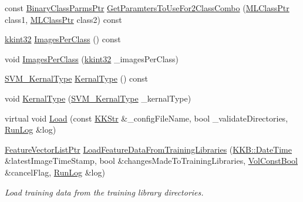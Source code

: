 \begin{DoxyCompactItemize}
const \hyperlink{namespace_k_k_m_l_l_aca399c0744e11553270ffaca507cfee7}{Binary\+Class\+Parms\+Ptr} \hyperlink{class_k_k_m_l_l_1_1_training_configuration2_a0caad40dc963b99056025ffa71552e68}{Get\+Paramters\+To\+Use\+For2\+Class\+Combo} (\hyperlink{namespace_k_k_m_l_l_ac272393853d59e72e8456f14cd6d8c23}{M\+L\+Class\+Ptr} class1, \hyperlink{namespace_k_k_m_l_l_ac272393853d59e72e8456f14cd6d8c23}{M\+L\+Class\+Ptr} class2) const 
\item 
\hyperlink{namespace_k_k_b_a8fa4952cc84fda1de4bec1fbdd8d5b1b}{kkint32} \hyperlink{class_k_k_m_l_l_1_1_training_configuration2_a0601497691c99932c183fdc963f893f0}{Images\+Per\+Class} () const 
\item 
void \hyperlink{class_k_k_m_l_l_1_1_training_configuration2_abf4bb79d4b15976cdd58d0822b405cb3}{Images\+Per\+Class} (\hyperlink{namespace_k_k_b_a8fa4952cc84fda1de4bec1fbdd8d5b1b}{kkint32} \+\_\+images\+Per\+Class)
\item 
\hyperlink{namespace_k_k_m_l_l_a14bbc982261fe6adeaf682c543ef9569}{S\+V\+M\+\_\+\+Kernal\+Type} \hyperlink{class_k_k_m_l_l_1_1_training_configuration2_a5e39618d6daf2b3880e041f68ad11892}{Kernal\+Type} () const 
\item 
void \hyperlink{class_k_k_m_l_l_1_1_training_configuration2_a7b69e2672eaf4dd259dc72b6caacfa89}{Kernal\+Type} (\hyperlink{namespace_k_k_m_l_l_a14bbc982261fe6adeaf682c543ef9569}{S\+V\+M\+\_\+\+Kernal\+Type} \+\_\+kernal\+Type)
\item 
virtual void \hyperlink{class_k_k_m_l_l_1_1_training_configuration2_a89bb53ad704979d78053e1ae8d1253c6}{Load} (const \hyperlink{class_k_k_b_1_1_k_k_str}{K\+K\+Str} \&\+\_\+config\+File\+Name, bool \+\_\+validate\+Directories, \hyperlink{class_k_k_b_1_1_run_log}{Run\+Log} \&log)
\item 
\hyperlink{namespace_k_k_m_l_l_acf2ba92a3cf03e2b19674b24ff488ef6}{Feature\+Vector\+List\+Ptr} \hyperlink{class_k_k_m_l_l_1_1_training_configuration2_a0458a41c5a46980b580fed613bf35734}{Load\+Feature\+Data\+From\+Training\+Libraries} (\hyperlink{class_k_k_b_1_1_date_time}{K\+K\+B\+::\+Date\+Time} \&latest\+Image\+Time\+Stamp, bool \&changes\+Made\+To\+Training\+Libraries, \hyperlink{namespace_k_k_b_a7d390f568e2831fb76b86b56c87bf92f}{Vol\+Const\+Bool} \&cancel\+Flag, \hyperlink{class_k_k_b_1_1_run_log}{Run\+Log} \&log)
\begin{DoxyCompactList}\small\item\em Load training data from the training library directories. \end{DoxyCompactList}\item 

\end{DoxyCompactItemize}
